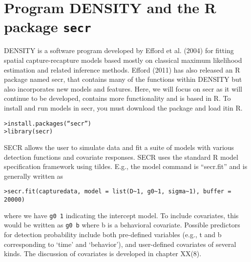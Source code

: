 \section{Program DENSITY and the R package \mbox{\tt secr} }

DENSITY is a software program developed by Efford et al. (2004) for
fitting spatial capture-recapture models based mostly on classical
maximum likelihood estimation and related inference methods.  Efford
(2011) has also released an R package named secr, that contains many
of the functions within DENSITY but also incorporates new models and
features.  Here, we will focus on secr as it will continue to be
developed, contains more functionality and is based in R.  To install
and run models in secr, you must download the package and load itin R.

\begin{verbatim}
>install.packages(“secr”)
>library(secr)
\end{verbatim}

SECR allows the user to simulate data and fit a suite of models with
various detection functions and covariate responses.  SECR uses the
standard R model specification framework using tildes. E.g., the model
command is “secr.fit” and is generally written as

\begin{verbatim}
>secr.fit(capturedata, model = list(D~1, g0~1, sigma~1), buffer = 20000)
\end{verbatim}

where we have \mbox{\tt g0~1} indicating the intercept model.  To include
covariates, this would be written as \mbox{\tt g0~b} where b is a behavioral
covariate.  Possible predictors for detection probability include both
pre-defined variables (e.g., t and b corresponding to ‘time’ and
‘behavior’), and user-defined covariates of several kinds. The
discussion of covariates is developed in chapter XX(8).

